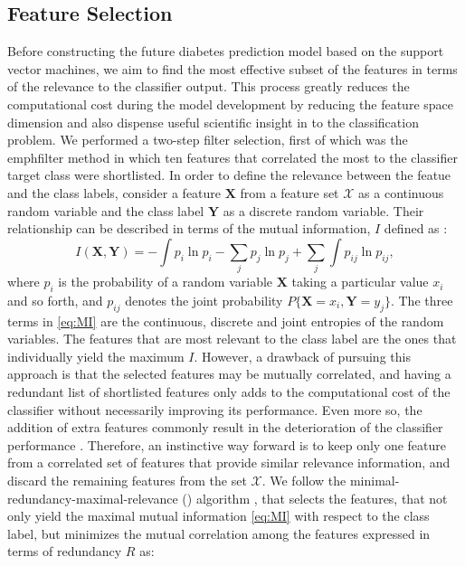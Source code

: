 \documentclass[journal,comsoc]{IEEEtran}
\begin{document}
\subsection{Feature Selection}
%
Before constructing the future diabetes prediction model based on the support vector machines, we aim to find the most effective subset of the features in terms of the relevance to the classifier output. This process greatly reduces the computational cost during the model development by reducing the feature space dimension and also dispense useful scientific insight in to the classification problem. We performed a two-step filter selection, first of which was the emph{filter} method in which ten features that correlated the most to the classifier target class were shortlisted. In order to define the relevance between the featue and the class labels, consider a feature $\mathbf{X}$ from a feature set $\mathcal X$ as a continuous random variable and the class label $\mathbf{Y}$ as a discrete random variable. Their relationship can be described in terms of the mutual information, $I$ defined as \cite{ross2014mutual}:
%
\begin{equation}
    I(\mathbf{X}, \mathbf{Y}) = - \int p_i\ln p_i - \sum_j p_j\ln p_j + \sum_j \int p_{ij}\ln p_{ij},
    \label{eq:MI}
\end{equation}
%
where $p_{i}$ is the probability of a random variable $\mathbf{X}$ taking a particular value $x_i$ and so forth, and $p_{ij}$ denotes the joint probability $P\{\mathbf{X}= x_i, \mathbf{Y}=y_j\}$. The three terms in \eqref{eq:MI} are the continuous, discrete and joint entropies of the random variables. The features that are most relevant to the class label are the ones that individually yield the maximum $I$. However, a drawback of pursuing this approach is that the selected features may be mutually correlated, and having a redundant list of shortlisted features only adds to the computational cost of the classifier without necessarily improving its performance. Even more so, the addition of extra features commonly result in the deterioration of the classifier performance \cite{trunk1979problem}. Therefore, an instinctive way forward is to keep only one feature from a correlated set of features that provide similar relevance information, and discard the remaining features from the set $\mathcal X$. We follow the minimal-redundancy-maximal-relevance () algorithm \cite{mRMR}, that selects the features, that not only yield the maximal mutual information \eqref{eq:MI} with respect to the class label, but minimizes the mutual correlation among the features expressed in terms of redundancy $R$ as:
\end{document}
